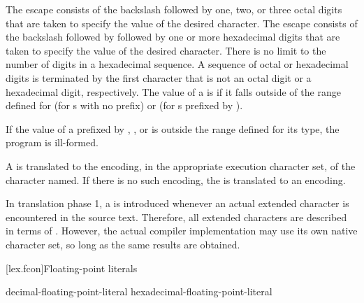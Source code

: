 \pnum
The escape
%
 consists of the backslash followed by one,
two, or three octal digits that are taken to specify the value of the
desired character. The escape
%
consists of the backslash followed by  followed by one or more
hexadecimal digits that are taken to specify the value of the desired
character. There is no limit to the number of digits in a hexadecimal
sequence. A sequence of octal or hexadecimal digits is terminated by the
first character that is not an octal digit or a hexadecimal digit,
respectively.
%
The value of a  is  if it falls outside of the 
range defined for  (for s with no prefix) or
 (for s prefixed by ).
\begin{note}
If the value of a  prefixed by
, , or 
is outside the range defined for its type,
the program is ill-formed.
\end{note}

\pnum
A  is translated to the encoding, in the appropriate
execution character set, of the character named. If there is no such
encoding, the  is translated to an
 encoding.
\begin{note}
In translation phase 1, a  is introduced whenever an
actual extended
character is encountered in the source text. Therefore, all extended
characters are described in terms of . However,
the actual compiler implementation may use its own native character set,
so long as the same results are obtained.
\end{note}

[lex.fcon]{Floating-point literals}

%
\begin{bnf}
\br
    decimal-floating-point-literal\br
    hexadecimal-floating-point-literal
\end{bnf}

